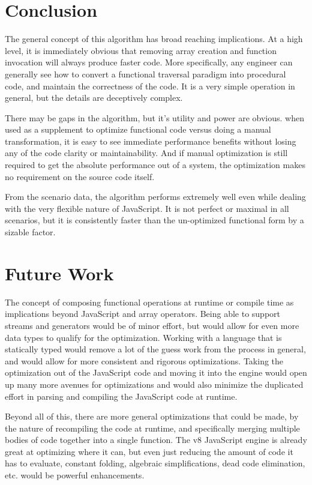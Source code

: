 \chapter{Conclusion}

The general concept of this algorithm has broad reaching implications.  At a high level, it is immediately obvious that removing array creation and function invocation will always produce faster code.  More specifically, any engineer can generally see how to convert a functional traversal paradigm into procedural code, and maintain the correctness of the code. It is a very simple operation in general, but the details are deceptively complex.

There may be gaps in the algorithm, but it's utility and power are obvious.  when used as a supplement to optimize functional code versus doing a manual transformation, it is easy to see immediate performance benefits without losing any of the code clarity or maintainability.  And if manual optimization is still required to get the absolute performance out of a system, the optimization makes no requirement on the source code itself.    

From the scenario data, the algorithm performs extremely well even while dealing with the very flexible nature of JavaScript. It is not perfect or maximal in all scenarios, but it is consistently faster than the un-optimized functional form by a sizable factor.

\chapter{Future Work}

The concept of composing functional operations at runtime or compile time as implications beyond JavaScript and array operators. Being able to support streams and generators would be of minor effort, but would allow for even more data types to qualify for the optimization.  Working with a language that is statically typed would remove a lot of the guess work from the process in general, and would allow for more consistent and rigorous optimizations.  Taking the optimization out of the JavaScript code and moving it into the engine would open up many more avenues for optimizations and would also minimize the duplicated effort in parsing and compiling the JavaScript code at runtime.

Beyond all of this, there are more general optimizations that could be made, by the nature of recompiling the code at runtime, and specifically merging multiple bodies of code together into a single function.  The v8 JavaScript engine is already great at optimizing where it can, but even just reducing the amount of code it has to evaluate, constant folding, algebraic simplifications, dead code elimination, etc. would be powerful enhancements.